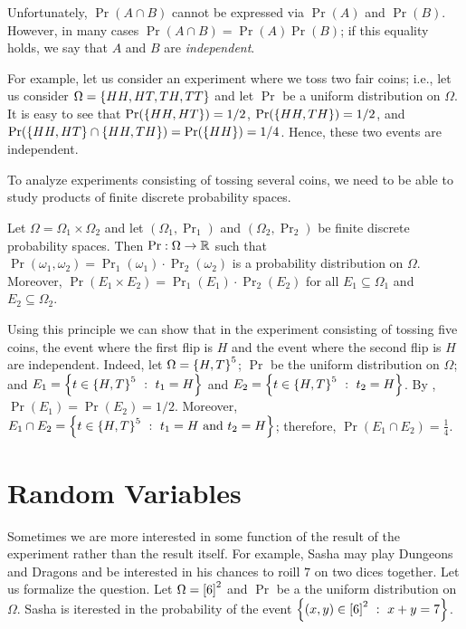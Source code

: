Unfortunately, $\Pr(A \cap B)$ cannot be expressed via $\Pr(A)$ and $\Pr(B)$.
However, in many cases $\Pr(A \cap B) = \Pr(A) \Pr(B)$; if this equality holds,
we say that $A$ and $B$ are \emph{independent}.

For example, let us consider an experiment where we toss two fair coins; i.e.,
let us consider $\Omega = \set{HH, HT, TH, TT}$ and let $\Pr$ be a uniform
distribution on $\Omega$. It is easy to see that $\Pr(\set{HH, HT}) = 1 / 2$,
$\Pr(\set{HH, TH}) = 1 / 2$, and $\Pr(\set{HH, HT} \cap \set{HH, TH}) =
\Pr(\set{HH}) =  1 / 4$. Hence, these two events are independent.

To analyze experiments consisting of tossing several coins, we need to be able
to study products of finite discrete probability spaces.
\begin{theorem}
\label{theorem:multiplicative-principle-probability}
  Let $\Omega = \Omega_1 \times \Omega_2$ and let $(\Omega_1, \Pr_1)$ and
  $(\Omega_2, \Pr_2)$ be finite discrete probability spaces. Then $\Pr : \Omega
  \to {\mathbb{R}}$ such that $\Pr(\omega_1, \omega_2) = \Pr_1(\omega_1) \cdot
  \Pr_2(\omega_2)$ is a probability distribution on $\Omega$.
  Moreover, $\Pr(E_1 \times E_2) = \Pr_1(E_1) \cdot \Pr_2(E_2)$ for all 
  $E_1 \subseteq \Omega_1$ and $E_2 \subseteq \Omega_2$.
\end{theorem}

Using this principle we can show that in the experiment consisting of tossing
five coins, the event where the first flip is $H$ and the event where the second
flip is $H$ are independent. Indeed, let $\Omega = \set{H, T}^5$; 
$\Pr$ be the uniform distribution on $\Omega$; and 
$E_1 = \set[t_1 = H]{t \in \set{H, T}^5}$ and
$E_2 = \set[t_2 = H]{t \in \set{H, T}^5}$. By
,
$\Pr(E_1) = \Pr(E_2) = 1 / 2$. Moreover, 
$E_1 \cap E_2 = \set[t_1 = H \text{ and } t_2 = H]{t \in \set{H, T}^5}$;
therefore, $\Pr(E_1 \cap E_2) = \frac{1}{4}$.

\section{Random Variables}
Sometimes we are more interested in some function of the result of the
experiment rather than the result itself. For example, Sasha may play Dungeons
and Dragons and be interested in his chances to roill $7$ on two dices together.
Let us formalize the question. Let $\Omega = {[{6}]}^2$ and $\Pr$ be a the
uniform distribution on $\Omega$. Sasha is iterested in the probability of the
event $\set[x + y = 7]{(x, y) \in \range{6}^2}$.

